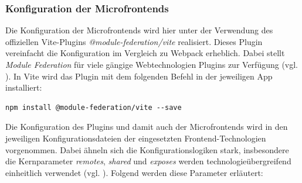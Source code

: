 \subsubsection{Konfiguration der Microfrontends}
Die Konfiguration der Microfrontends wird hier unter der Verwendung des offiziellen Vite-Plugins \textit{@module-federation/vite} realisiert. Dieses Plugin vereinfacht die Konfiguration im Vergleich zu Webpack erheblich.
Dabei stellt \textit{Module Federation} für viele gängige Webtechnologien Plugins zur Verfügung (vgl. \cite{mf_integrations_guide}).
In Vite wird das Plugin mit dem folgenden Befehl in der jeweiligen App installiert:
\begin{lstlisting}[language=Shell, caption={Installieren des Vite-Plugins}, label={lst:microfrontends_plugin_install}]
npm install @module-federation/vite --save
\end{lstlisting}
Die Konfiguration des Plugins und damit auch der Microfrontends wird in den jeweiligen Konfigurationsdateien der eingesetzten Frontend-Technologien vorgenommen. Dabei ähneln sich die Konfigurationslogiken stark, insbesondere die Kernparameter \textit{remotes}, \textit{shared} und \textit{exposes} werden technologieübergreifend einheitlich verwendet (vgl. \cite[\texttt{building\_management/apps/communication/vite.config.js}]{eigener_code_usb}). Folgend werden diese Parameter erläutert:
